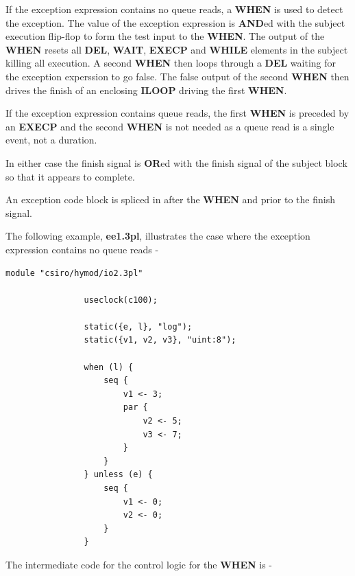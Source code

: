\documentclass[10pt,a4paper,twoside,fleqn]{book}
\begin{document}
            If the exception expression contains no queue reads, a {\bf WHEN} is
            used to detect the exception. The value of the exception expression is
            {\bf AND}ed with the subject execution flip-flop to form the test input
            to the {\bf WHEN}. The output of the {\bf WHEN} resets all {\bf DEL},
            {\bf WAIT}, {\bf EXECP} and {\bf WHILE} elements in the subject killing
            all execution. A second {\bf WHEN} then loops through a {\bf DEL}
            waiting for the exception experssion to go false. The false output of
            the second {\bf WHEN} then drives the finish of an enclosing {\bf
            ILOOP} driving the first {\bf WHEN}.
            
            If the exception expression contains queue reads, the first {\bf WHEN}
            is preceded by an {\bf EXECP} and the second {\bf WHEN} is not needed as
            a queue read is a single event, not a duration.
            
            In either case the finish signal is {\bf OR}ed with the finish signal of the
            subject block so that it appears to complete.

            An exception code block is spliced in after the {\bf WHEN} and prior to
            the finish signal.

            The following example, {\bf ee1.3pl}, illustrates the case where the
            exception expression contains no queue reads -

            \begin{lstlisting}[gobble=12, language=threepl]
                module "csiro/hymod/io2.3pl"

                useclock(c100);

                static({e, l}, "log");
                static({v1, v2, v3}, "uint:8");

                when (l) {
                    seq {
                        v1 <- 3;
                        par {
                            v2 <- 5;
                            v3 <- 7;
                        }
                    }
                } unless (e) {
                    seq {
                        v1 <- 0;
                        v2 <- 0;
                    }
                }
            \end{lstlisting}
            
            The intermediate code for the control logic for the {\bf WHEN} is -
\end{document}
